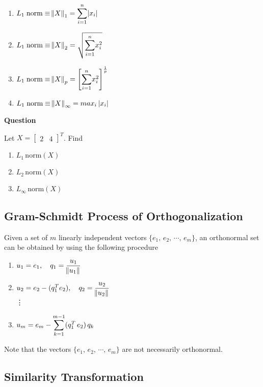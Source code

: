 \begin{enumerate}
  \item $L_1 \; \text{norm} \equiv \norm{X}_1 = \mathlarger{\sum_{i=1}^{n}} \abs{x_i}$
  \item $L_1 \; \text{norm} \equiv \norm{X}_2 = \sqrt{\mathlarger{\sum_{i=1}^{n}} x_i^2}$
  \item $L_1 \; \text{norm} \equiv \norm{X}_p = \Bigg[\mathlarger{\sum_{i=1}^{n}} x_i^2\Bigg]^{\frac{1}{p}}$
  \item $L_1 \; \text{norm} \equiv \norm{X}_{\infty} = max_i \, \abs{x_i}$
\end{enumerate}

\noindent \textbf{Question}

\noindent Let $X = \begin{bmatrix}2 & 4\end{bmatrix}^T$. Find

\begin{enumerate}
  \item $L_1 \, \text{norm}(X)$
  \item $L_2 \, \text{norm}(X)$
  \item $L_{\infty} \, \text{norm}(X)$
\end{enumerate}

\subsection{Gram-Schmidt Process of Orthogonalization}

Given a set of $m$ linearly independent vectors $\{e_1, \, e_2, \, \cdots, \, e_m\}$,
an orthonormal set can be obtained by using the following procedure

\begin{enumerate}
  \item $u_1 = e_1, \quad q_1 = \dfrac{u_1}{\norm{u_1}}$
  \item $u_2 = e_2 - (q_1^T e_2), \quad q_2 = \dfrac{u_2}{\norm{u_2}}$ \\
  \vdots \\
  \item $u_m = e_m - \mathlarger{\sum_{k=1}^{m-1}}(q_1^T \, e_2)\, q_k$
\end{enumerate}

\noindent Note that the vectors $\{e_1, \, e_2, \, \cdots, \, e_m\}$ are not
necessarily orthonormal.

\subsection{Similarity Transformation}

